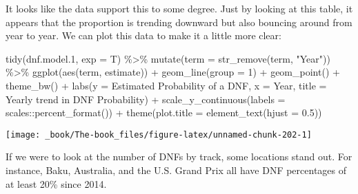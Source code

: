 \documentclass[
]{book}
\newenvironment{Shaded}{\begin{snugshade}}{\end{snugshade}}
\newcommand{\AttributeTok}[1]{\textcolor[rgb]{0.77,0.63,0.00}{#1}}
\newcommand{\DecValTok}[1]{\textcolor[rgb]{0.00,0.00,0.81}{#1}}
\newcommand{\FloatTok}[1]{\textcolor[rgb]{0.00,0.00,0.81}{#1}}
\newcommand{\FunctionTok}[1]{\textcolor[rgb]{0.00,0.00,0.00}{#1}}
\newcommand{\NormalTok}[1]{#1}
\newcommand{\SpecialCharTok}[1]{\textcolor[rgb]{0.00,0.00,0.00}{#1}}
\newcommand{\StringTok}[1]{\textcolor[rgb]{0.31,0.60,0.02}{#1}}
\begin{document}
It looks like the data support this to some degree. Just by looking at this table, it appears that the proportion is trending downward but also bouncing around from year to year. We can plot this data to make it a little more clear:

\begin{Shaded}
\begin{Highlighting}[]
\FunctionTok{tidy}\NormalTok{(dnf.model}\FloatTok{.1}\NormalTok{, }\AttributeTok{exp =}\NormalTok{ T) }\SpecialCharTok{\%\textgreater{}\%}
  \FunctionTok{mutate}\NormalTok{(}\AttributeTok{term =} \FunctionTok{str\_remove}\NormalTok{(term, }\StringTok{"Year"}\NormalTok{)) }\SpecialCharTok{\%\textgreater{}\%} 
  \FunctionTok{ggplot}\NormalTok{(}\FunctionTok{aes}\NormalTok{(term, estimate)) }\SpecialCharTok{+}
  \FunctionTok{geom\_line}\NormalTok{(}\AttributeTok{group =} \DecValTok{1}\NormalTok{) }\SpecialCharTok{+}
  \FunctionTok{geom\_point}\NormalTok{() }\SpecialCharTok{+} 
  \FunctionTok{theme\_bw}\NormalTok{() }\SpecialCharTok{+}
  \FunctionTok{labs}\NormalTok{(}\AttributeTok{y =} \StringTok{\textquotesingle{}Estimated Probability of a DNF\textquotesingle{}}\NormalTok{,}
       \AttributeTok{x =} \StringTok{\textquotesingle{}Year\textquotesingle{}}\NormalTok{,}
       \AttributeTok{title =} \StringTok{\textquotesingle{}Yearly trend in DNF Probability\textquotesingle{}}\NormalTok{) }\SpecialCharTok{+}
\FunctionTok{scale\_y\_continuous}\NormalTok{(}\AttributeTok{labels =}\NormalTok{ scales}\SpecialCharTok{::}\FunctionTok{percent\_format}\NormalTok{()) }\SpecialCharTok{+}
  \FunctionTok{theme}\NormalTok{(}\AttributeTok{plot.title =} \FunctionTok{element\_text}\NormalTok{(}\AttributeTok{hjust =} \FloatTok{0.5}\NormalTok{))}
\end{Highlighting}
\end{Shaded}

\begin{center}\texttt{[image: \_book/The-book\_files/figure-latex/unnamed-chunk-202-1]} \end{center}

If we were to look at the number of DNFs by track, some locations stand out. For instance, Baku, Australia, and the U.S. Grand Prix all have DNF percentages of at least 20\% since 2014.
\end{document}

